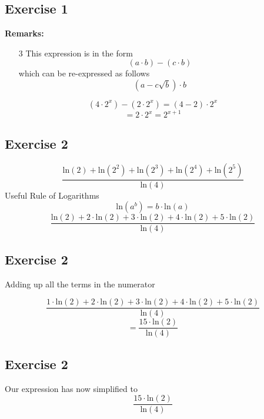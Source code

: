 \documentclass[]{report}
\begin{document}
\subsection{Exercise 1}


\textbf{Remarks:}
\begin{itemize}
\item[3] This expression is in the form 
\[ (a  \cdot b ) - ( c  \cdot b) \]
which can be re-expressed as follows 
\[ (a - c\sqrt{b} )  \cdot b \]
\end{itemize}
\[ (4 \cdot 2^x) -  (2\cdot 2^{x}) = (4-2)  \cdot 2^{x} \]
\[   = 2 \cdot 2^x = 2^{x+1}\]

\subsection{Exercise 2}


\[  \frac{\mbox{ln}(2) + \mbox{ln}(2^2) + \mbox{ln}(2^3)  + \mbox{ln}(2^4) + \mbox{ln}(2^5)  }  {\mbox{ln}(4)}  \]
Useful Rule of Logarithms
\[  \mbox{ln}(a^b)  = b\cdot \mbox{ln}(a)  \]
\[  \frac{\mbox{ln}(2) + 2 \cdot \mbox{ln}(2) + 3 \cdot\mbox{ln}(2)  + 4 \cdot \mbox{ln}(2) + 5 \cdot \mbox{ln}(2)  }  {\mbox{ln}(4)}  \]
\subsection{Exercise 2}

Adding up all the terms in the numerator

\[  \frac{1\cdot\mbox{ln}(2) + 2 \cdot \mbox{ln}(2) + 3 \cdot\mbox{ln}(2)  + 4 \cdot \mbox{ln}(2) + 5 \cdot \mbox{ln}(2)  }  {\mbox{ln}(4)} \]  \[= \frac{15 \cdot \mbox{ln}(2) }{\mbox{ln}(4)} \]



\subsection{Exercise 2}

Our expression has now simplified to 
\[\frac{15 \cdot \mbox{ln}(2) }{\mbox{ln}(4)} \]
\end{document}
